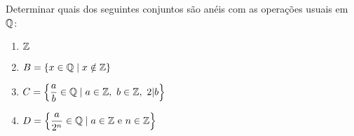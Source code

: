 \documentclass[12pt]{article}
\begin{document}
\vesp

\questao Determinar quais dos seguintes conjuntos s\~ao an{\'e}is com as opera\c{c}\~oes usuais em $\mathbb{Q}$:
	\begin{multicols}{2}
		\begin{enumerate}[label=({\alph*})]
			\item $\mathbb{Z}$
			\item $B = \{x \in \mathbb{Q} \mid x \notin \mathbb{Z}\}$
			\item $C = \left\{\dfrac{a}{b} \in \mathbb{Q} \mid a \in \mathbb{Z},\ b \in \mathbb{Z},\ 2 |b \right\}$
			\item $D = \left\{\dfrac{a}{2^n} \in \mathbb{Q} \mid a \in \mathbb{Z} \mbox{ e } n \in \mathbb{Z} \right\}$
		\end{enumerate}
	\end{multicols}

\vesp
\end{document}
